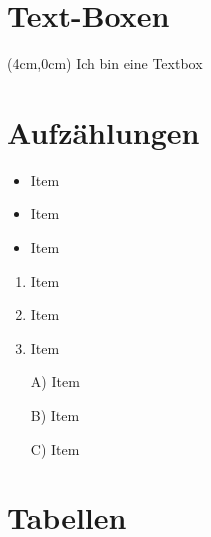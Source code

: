 \section{Text-Boxen}
\begin{textblock*}{\textwidth}(4cm,0cm)
  Ich bin eine Textbox
\end{textblock*}


\section{Aufzählungen}
\begin{itemize}[itemsep=0pt]
  \item Item
  \item Item
  \item Item
\end{itemize}

\begin{enumerate}[itemsep=0pt]
  \item Item
  \item Item
  \item Item
\end{enumerate}

\begin{itemize}[itemsep=0pt]
  \item[A)] Item
  \item[B)] Item
  \item[C)] Item
\end{itemize}

\section{Tabellen}

